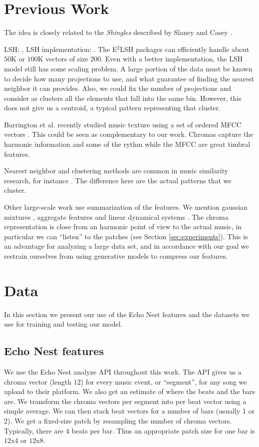 \documentclass{article}
\begin{document}
\section{Previous Work}\label{sec:prevwork}
The idea is closely related to the \textit{Shingles} described by
Slaney and Casey \cite{Casey2006,Casey2007,Casey2008}. 

LSH: \cite{Datar2004}, LSH implementation: \cite{E2LSH}.
The E$^2$LSH packages can efficiently handle about $50$K or $100$K
vectors of size $200$. Even with a better implementation, the LSH
model still has some scaling problem. A large portion of the data
must be known to decide how many projections to use, and what guarantee
of finding the nearest neighbor it can provides. Also, we could fix the
number of projections and consider as clusters all the elements that
fall into the same bin. However, this does not give us a centroid, a
typical pattern representing that cluster.

Barrington et al. recently studied music texture using a set of ordered
MFCC vectors \cite{Barrington2009a}. This could be seen as complementary
to our work. Chromas capture the harmonic information and some of the
rythm while the MFCC are great timbral features.

Nearest neighbor and clustering methods are common in music similarity 
research, for instance \cite{Cano2004,Holzapfel2009}. The difference here 
are the actual patterns that we cluster.

Other large-scale work use summarization of the features. We mention 
gaussian mixtures \cite{Mandel2005}, aggregate features \cite{Bergstra2006a}
and linear dynamical systems \cite{Barrington2009a}. The chroma representation
is close from an harmonic point of view to the actual music, in particular
we can ``listen'' to the patches (see Section \ref{sec:experiments}).
This is an advantage for analyzing a large data set, and in accordance with our goal
we restrain ourselves from using generative models to compress our features.


\section{Data}\label{sec:data}
In this section we present our use of the Echo Nest features and the
datasets we use for training and testing our model.


\subsection{Echo Nest features}
We use the Echo Nest analyze API \cite{EchoNest} throughout this work.
The API gives us a chroma vector (length $12$) for every music event, 
or ``segment'', for any song we upload to their platform. 
We also get an estimate of where the beats and the bars are. 
We transform the chroma vectors per segment into per beat vector using a 
simple average. We can then stack beat vectors for a number of bars (usually 1 or 2). 
We get a fixed-size patch by resampling the number of chroma vectors. Typically,
there are $4$ beats per bar. Thus an appropriate patch size for one bar
is $12$x$4$ or $12$x$8$.
\end{document}
